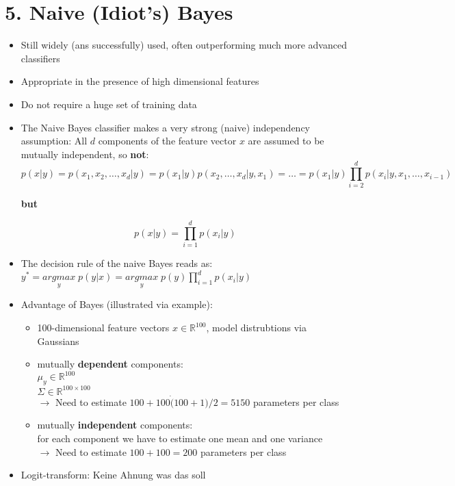 \section*{5. Naive (Idiot's) Bayes}
\begin{itemize}
    \item
        Still widely (ans successfully) used, often outperforming much more advanced classifiers
    \item
        Appropriate in the presence of high dimensional features 
    \item
        Do not require a huge set of training data
    \item
        The Naive Bayes classifier makes a very strong (naive) independency assumption: All $d$ components of the feature vector $x$ are assumed to be mutually independent, so \textbf{not}:
        $$ p(x|y) = p(x_1, x_2, \dots, x_d | y) = p(x_1|y) p( x_2, \dots, x_d | y, x_1) = \dots = p(x_1|y) \prod_{i=2}^d p(x_i|y, x_1, \dots, x_{i-1})$$
        \begin{center}\textbf{but}\end{center}
        $$p(x|y) = \prod_{i=1}^d p(x_i|y)$$
    \item
        The decision rule of the naive Bayes reads as: $ y^* = \underset{y}{argmax} \;p(y|x) = \underset{y}{argmax} \;p(y) \prod_{i=1}^{d} p(x_i|y) $
    \item
        Advantage of Bayes (illustrated via example):
        \begin{itemize}
            \item
                100-dimensional feature vectors $x \in \mathbb{R}^{100}$, model distrubtions via Gaussians
            \item
                mutually \textbf{dependent} components:\\ $\mu_y \in \mathbb{R}^{100}$ \\ $\Sigma \in \mathbb{R}^{100 \times 100}$\\
                $\rightarrow$ Need to estimate $100 + 100 \dot (100+1)/2 = 5150$ parameters per class
            \item
                mutually \textbf{independent} components: \\ for each component we have to estimate one mean and one variance\\
                $\rightarrow$ Need to estimate $100+100=200$ parameters per class
        \end{itemize}
    \item
        Logit-transform: Keine Ahnung was das soll\\

\end{itemize}
